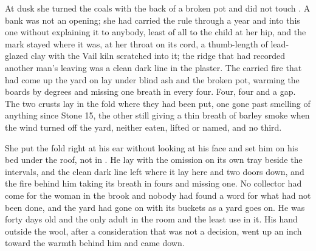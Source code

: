 At dusk she turned the coals with the back of a broken pot and did not touch . A bank was not an opening; she had carried the rule through a year and into this one without explaining it to anybody, least of all to the child at her hip, and the mark stayed where it was, at her throat on its cord, a thumb-length of lead-glazed clay with the Vail kiln scratched into it; the ridge that had recorded another man's leaving was a clean dark line in the plaster. The carried fire that had come up the yard on  lay under blind ash and the broken pot, warming the boards by degrees and missing one breath in every four. Four, four and a gap. The two crusts lay in the fold where they had been put, one gone past smelling of anything since Stone 15, the other still giving a thin breath of barley smoke when the wind turned off the yard, neither eaten, lifted or named, and no third.

She put the fold right at his ear without looking at his face and set him on his bed under the roof, not in . He lay with the omission on its own tray beside the intervals, and the clean dark line left where it lay here and two doors down, and the fire behind him taking its breath in fours and missing one. No collector had come for the woman in the brook and nobody had found a word for what had not been done, and the yard had gone on with its buckets as a yard goes on. He was forty days old and the only adult in the room and the least use in it. His hand outside the wool, after a consideration that was not a decision, went up an inch toward the warmth behind him and came down.
